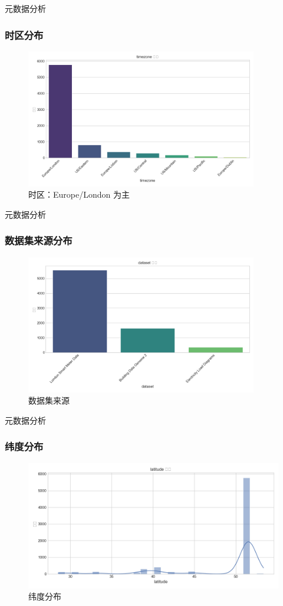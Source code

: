 \documentclass{beamer} %
\begin{document}
\begin{frame}{元数据分析}
    \frametitle{时区分布}
    \begin{figure}
        \centering
        \includegraphics[width=0.9\textwidth]{../plots/metadata_dist_timezone.png}
        \caption{时区：Europe/London 为主}
    \end{figure}
\end{frame}

\begin{frame}{元数据分析}
    \frametitle{数据集来源分布}
    \begin{figure}
        \centering
        \includegraphics[width=0.9\textwidth]{../plots/metadata_dist_dataset.png}
        \caption{数据集来源}
    \end{figure}
\end{frame}

\begin{frame}{元数据分析}
    \frametitle{纬度分布}
    \begin{figure}
        \centering
        \includegraphics[width=\textwidth]{../plots/metadata_hist_latitude.png}
        \caption{纬度分布}
    \end{figure}
\end{frame}
\end{document}
